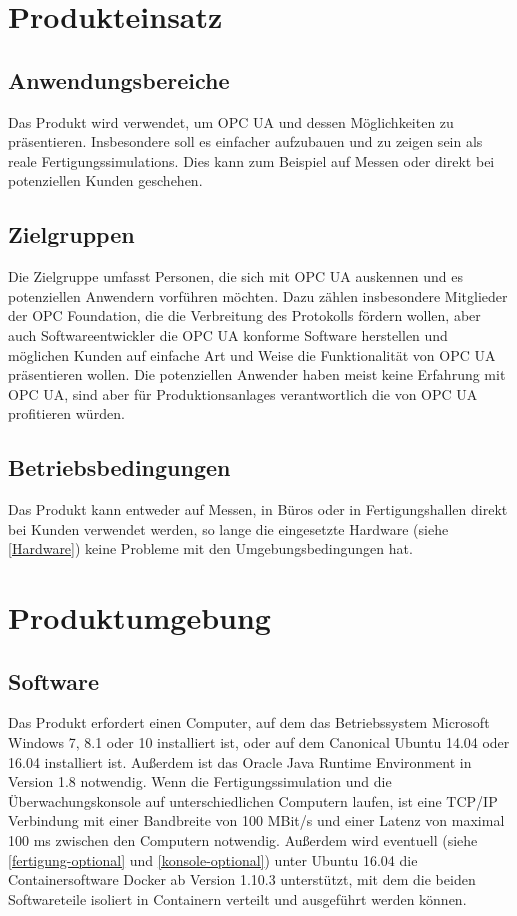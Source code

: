 \documentclass[parskip=full]{scrartcl}
\begin{document}
\newpage
\section{Produkteinsatz}
\subsection{Anwendungsbereiche}
Das Produkt wird verwendet, um \gls{OPC UA} und dessen Möglichkeiten zu präsentieren.
Insbesondere soll es einfacher aufzubauen und zu zeigen sein als reale \glspl{Fertigungssimulation}.
Dies kann zum Beispiel auf Messen oder direkt bei potenziellen Kunden geschehen.
\subsection{Zielgruppen}
Die Zielgruppe umfasst Personen, die sich mit OPC UA auskennen und es potenziellen Anwendern vorführen möchten.
Dazu zählen insbesondere Mitglieder der OPC Foundation, die die Verbreitung des Protokolls fördern wollen,
aber auch Softwareentwickler die OPC UA konforme Software herstellen und möglichen Kunden auf einfache Art und
Weise die Funktionalität von OPC UA präsentieren wollen.
Die potenziellen Anwender haben meist keine Erfahrung mit OPC UA, sind aber für \glspl{Produktionsanlage} verantwortlich
die von OPC UA profitieren würden.

\subsection{Betriebsbedingungen}
Das Produkt kann entweder auf Messen, in Büros oder in Fertigungshallen direkt bei Kunden verwendet werden,
so lange die eingesetzte Hardware (siehe \ref{Hardware}) keine Probleme mit den Umgebungsbedingungen hat.

\pagebreak
\section{Produktumgebung}
\subsection{Software}
Das Produkt erfordert einen Computer, auf dem das Betriebssystem Microsoft Windows 7, 8.1 oder 10 installiert ist,
oder auf dem Canonical Ubuntu 14.04 oder 16.04 installiert ist. Außerdem ist das Oracle Java Runtime Environment in Version 1.8
notwendig. Wenn die Fertigungssimulation und die Überwachungskonsole auf unterschiedlichen Computern laufen,
ist eine TCP/IP Verbindung mit einer Bandbreite von 100 MBit/s und einer Latenz von maximal 100 ms zwischen den Computern notwendig.
Außerdem wird eventuell (siehe \ref{fertigung-optional} und \ref{konsole-optional}) unter Ubuntu 16.04 die Containersoftware Docker
ab Version 1.10.3 unterstützt, mit dem die beiden Softwareteile isoliert in Containern verteilt und ausgeführt werden können.
\end{document}
